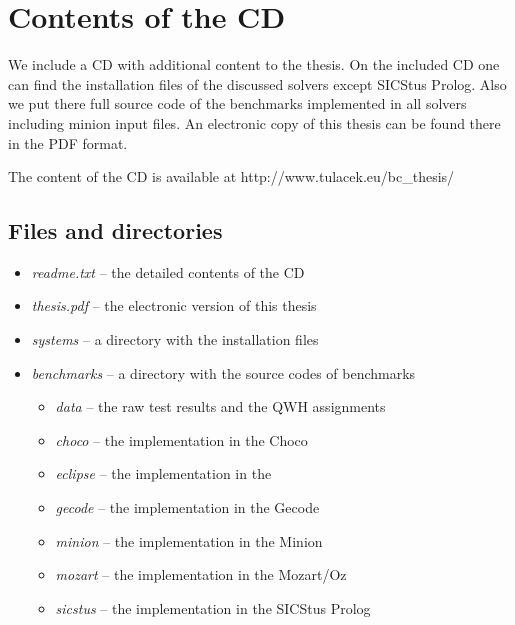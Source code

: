 \chapter{Contents of the CD}
\label{cdcontents}

We include a CD with additional content to the thesis. On the included CD one can 
find the installation files of the discussed solvers except SICStus Prolog. Also we 
put there full source code of the benchmarks implemented in all solvers including minion input files.
An electronic copy of this thesis can be found there in the PDF format.

The content of the CD is available at http://www.tulacek.eu/bc\_thesis/ 

\section{Files and directories}
\begin{itemize}
  \item {\em readme.txt} -- the detailed contents of the CD
  \item {\em thesis.pdf} -- the electronic version of this thesis
  \item {\em systems} -- a directory with the installation files
  \item {\em benchmarks} -- a directory with the source codes of benchmarks
  \begin{itemize}
    \item {\em data} -- the raw test results and the QWH assignments 
    \item {\em choco} -- the implementation in the Choco
    \item {\em eclipse} -- the implementation in the \eclipse
    \item {\em gecode} -- the implementation in the Gecode
    \item {\em minion} -- the implementation in the Minion
    \item {\em mozart} -- the implementation in the Mozart/Oz
    \item {\em sicstus} -- the implementation in the SICStus Prolog
  \end{itemize}
    
\end{itemize}
  